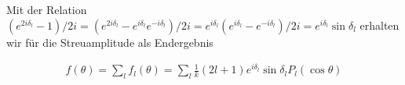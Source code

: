 Mit der Relation \((e^{2i\delta_l}-1)/2i = (e^{2i\delta_l}-e^{i\delta_l}e^{-i\delta_l})/2i =e^{i\delta_l} (e^{i\delta_l}-e^{-i\delta_l})/2i= e^{i\delta_l}\sin\delta_l\) erhalten wir für die Streuamplitude als Endergebnis

\begin{align}
  \label{eq:38}
  \boxed{f(\theta) = \sum_l f_l(\theta) = \sum_l \frac{1}{k} (2l+1)e^{i\delta_l}\sin\delta_l P_{l}(\cos\theta) }
\end{align}



